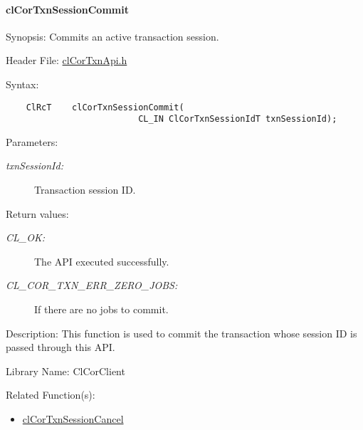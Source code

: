 \hypertarget{pagecor502}{}\paragraph{cl\-Cor\-Txn\-Session\-Commit}\label{pagecor502}
\begin{Desc}
\item[Synopsis:]Commits an active transaction session.\end{Desc}
\begin{Desc}
\item[Header File:]\hyperlink{cl_cor_txn_api_8h}{cl\-Cor\-Txn\-Api.h}\end{Desc}
\begin{Desc}
\item[Syntax:]

\footnotesize\begin{verbatim}    ClRcT    clCorTxnSessionCommit(
                          CL_IN ClCorTxnSessionIdT txnSessionId);    
\end{verbatim}
\normalsize
\end{Desc}
\begin{Desc}
\item[Parameters:]
\begin{description}
\item[{\em txn\-Session\-Id:}]Transaction session ID.\end{description}
\end{Desc}
\begin{Desc}
\item[Return values:]
\begin{description}
\item[{\em CL\_\-OK:}]The API executed successfully. \item[{\em CL\_\-COR\_\-TXN\_\-ERR\_\-ZERO\_\-JOBS:}]If there are no jobs to commit.\end{description}
\end{Desc}
\begin{Desc}
\item[Description:]This function is used to commit the transaction whose session ID is passed through this API.\end{Desc}
\begin{Desc}
\item[Library Name:]Cl\-Cor\-Client\end{Desc}
\begin{Desc}
\item[Related Function(s):]\begin{itemize}
\item \hyperlink{group__group13}{cl\-Cor\-Txn\-Session\-Cancel} \end{itemize}
\end{Desc}
